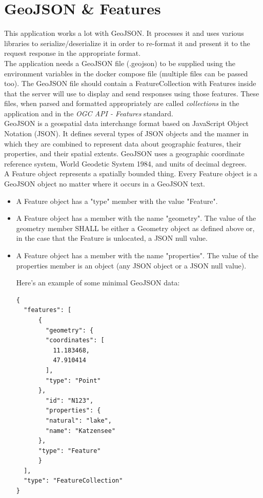 \section{GeoJSON \& Features}
This application works a lot with GeoJSON. It processes it and uses various libraries to serialize/deserialize it in order to re-format it and present it to the request response in the appropriate format.\\
The application needs a GeoJSON file (.geojson) to be supplied using the environment variables in the docker compose file (multiple files can be passed too). The GeoJSON file should contain a FeatureCollection with Features inside that the server will use to display and send responses using those features. These files, when parsed and formatted appropriately are called \textit{collections} in the application and in the \textit{OGC API - Features} standard.\\
\newline
GeoJSON is a geospatial data interchange format based on JavaScript
Object Notation (JSON).  It defines several types of JSON objects and
the manner in which they are combined to represent data about
geographic features, their properties, and their spatial extents.
GeoJSON uses a geographic coordinate reference system, World Geodetic
System 1984, and units of decimal degrees. \cite{WhatIsGeoJSON}\\
\newpage
A Feature object represents a spatially bounded thing.  Every Feature
object is a GeoJSON object no matter where it occurs in a GeoJSON
text.
\begin{itemize}
\item A Feature object has a "type" member with the value "Feature".
\item A Feature object has a member with the name "geometry". The value
of the geometry member SHALL be either a Geometry object as
defined above or, in the case that the Feature is unlocated, a
JSON null value.
\item A Feature object has a member with the name "properties".  The
value of the properties member is an object (any JSON object or a
JSON null value). \cite{WhatIsGeoJSON}\\
\newline

Here's an example of some minimal GeoJSON data:

\begin{verbatim}
{
  "features": [
      {
        "geometry": {
        "coordinates": [
          11.183468,
          47.910414
        ],
        "type": "Point"
      },
        "id": "N123",
        "properties": {
        "natural": "lake",
        "name": "Katzensee"
      },
      "type": "Feature"
      }
  ],
  "type": "FeatureCollection"
}
\end{verbatim}
\end{itemize}

